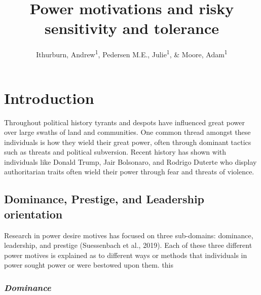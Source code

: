 \documentclass[
  english,
  a4paper,floatsintext]{apa7}
\title{Power motivations and risky sensitivity and tolerance}
\author{Ithurburn, Andrew\textsuperscript{1}, Pedersen M.E., Julie\textsuperscript{1}, \& Moore, Adam\textsuperscript{1}}
\date{}
\affiliation{\vspace{0.5cm}\textsuperscript{1} The University of Edinburgh}
\begin{document}
\maketitle

\hypertarget{introduction}{%
\section{Introduction}\label{introduction}}

Throughout political history tyrants and despots have influenced great power over large swaths of land and communities. One common thread amongst these individuals is how they wield their great power, often through dominant tactics such as threats and political subversion. Recent history has shown with individuals like Donald Trump, Jair Bolsonaro, and Rodrigo Duterte who display authoritarian traits often wield their power through fear and threats of violence.

\hypertarget{dominance-prestige-and-leadership-orientation}{%
\subsection{Dominance, Prestige, and Leadership orientation}\label{dominance-prestige-and-leadership-orientation}}

Research in power desire motives has focused on three sub-domains: dominance, leadership, and prestige (Suessenbach et al., 2019). Each of these three different power motives is explained as to different ways or methods that individuals in power sought power or were bestowed upon them. this

\hypertarget{dominance}{%
\subsubsection{\texorpdfstring{\emph{Dominance}}{Dominance}}\label{dominance}}
\end{document}
